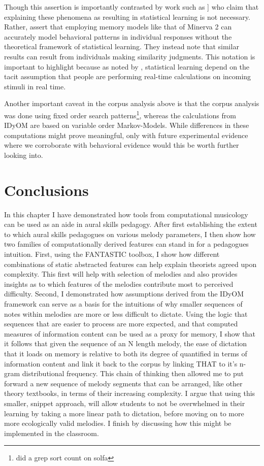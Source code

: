 \documentclass[]{book}
\let\rmarkdownfootnote\footnote%
\def\footnote{\protect\rmarkdownfootnote}
\begin{document}
Though this assertion is importantly contrasted by work such as \citet{jamiesonApplyingExemplarModel2009}{]} who claim that explaining these phenomena as resulting in statistical learning is not necessary.
Rather, \citet{jamiesonApplyingExemplarModel2009} assert that employing memory models like that of Minerva 2 can accurately model behavioral patterns in individual responses without the theoretical framework of statistical learning.
They instead note that similar results can result from individuals making similarity judgments.
This notation is important to highlight because as noted by \citet{perruchetImplicitLearningStatistical2006}, statistical learning depend on the tacit assumption that people are performing real-time calculations on incoming stimuli in real time.

Another important caveat in the corpus analysis above is that the corpus analysis was done using fixed order search patterns\footnote{did a grep sort count on solfa}, whereas the calculations from IDyOM are based on variable order Markov-Models.
While differences in these computations might prove meaningful, only with future experimental evidence where we corroborate with behavioral evidence would this be worth further looking into.

\hypertarget{conclusions-1}{%
\section{Conclusions}\label{conclusions-1}}

In this chapter I have demonstrated how tools from computational musicology can be used as an aide in aural skills pedagogy.
After first establishing the extent to which aural skills pedagogues on various melody parameters, I then show how two families of computationally derived features can stand in for a pedagogues intuition.
First, using the FANTASTIC toolbox, I show how different combinations of static abstracted features can help explain theorists agreed upon complexity.
This first will help with selection of melodies and also provides insights as to which features of the melodies contribute most to perceived difficulty.
Second, I demonstrated how assumptions derived from the IDyOM framework can serve as a basis for the intuitions of why smaller sequences of notes within melodies are more or less difficult to dictate.
Using the logic that sequences that are easier to process are more expected, and that computed measures of information content can be used as a proxy for memory, I show that it follows that given the sequence of an N length melody, the ease of dictation that it loads on memory is relative to both its degree of quantified in terms of information content and link it back to the corpus by linking THAT to it's n-gram distributional frequency.
This chain of thinking then allowed me to put forward a new sequence of melody segments that can be arranged, like other theory textbooks, in terms of their increasing complexity.
I argue that using this smaller, snippet approach, will allow students to not be overwhelmed in their learning by taking a more linear path to dictation, before moving on to more more ecologically valid melodies.
I finish by discussing how this might be implemented in the classroom.
\end{document}
